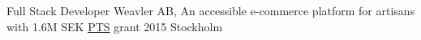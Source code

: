 {Full Stack Developer}
{Weavler AB, An accessible e-commerce platform for artisans with 1.6M SEK \href{pts.se}{PTS} grant 2015}
{Stockholm \Large{}}{}
{
}
